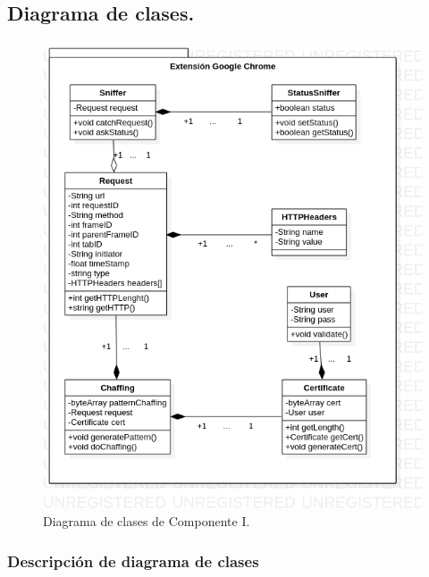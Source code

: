\documentclass[12pt, a4paper, titlepage]{report}
\begin{document}
			\subsection{Diagrama de clases.}
			
    			\begin{figure}[H]
    				\begin{center}	\includegraphics[width=13cm]{./imagenes/Disenio/Componente_1/CI_DC.png}
    				\caption{Diagrama de clases de Componente I.}
    				\end{center}
    			\end{figure}
			    
			    \newpage
			    \subsubsection{Descripción de diagrama de clases}
			    
\end{document}
